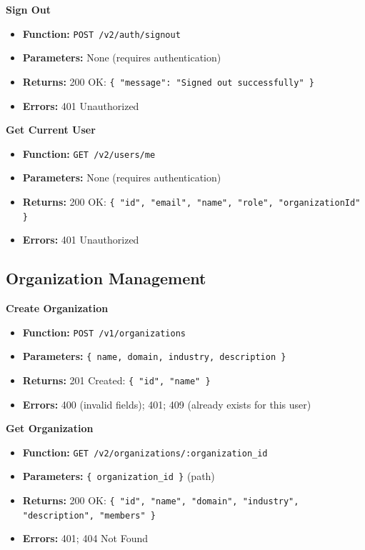 \documentclass[a4paper]{article}
\begin{document}
\textbf{Sign Out}
\begin{itemize}
  \item \textbf{Function:} \texttt{POST /v2/auth/signout}
  \item \textbf{Parameters:} None (requires authentication)
  \item \textbf{Returns:} 200 OK: \texttt{\{ "message": "Signed out successfully" \}}
  \item \textbf{Errors:} 401 Unauthorized
\end{itemize}

\textbf{Get Current User}
\begin{itemize}
  \item \textbf{Function:} \texttt{GET /v2/users/me}
  \item \textbf{Parameters:} None (requires authentication)
  \item \textbf{Returns:} 200 OK: \texttt{\{ "id", "email", "name", "role", "organizationId" \}}
  \item \textbf{Errors:} 401 Unauthorized
\end{itemize}

\subsection{Organization Management}

\textbf{Create Organization}
\begin{itemize}
  \item \textbf{Function:} \texttt{POST /v1/organizations}
  \item \textbf{Parameters:} \texttt{\{ name, domain, industry, description \}}
  \item \textbf{Returns:} 201 Created: \texttt{\{ "id", "name" \}}
  \item \textbf{Errors:} 400 (invalid fields); 401; 409 (already exists for this user)
\end{itemize}

\textbf{Get Organization}
\begin{itemize}
  \item \textbf{Function:} \texttt{GET /v2/organizations/:organization\_id}
  \item \textbf{Parameters:} \texttt{\{ organization\_id \}} (path)
  \item \textbf{Returns:} 200 OK: \texttt{\{ "id", "name", "domain", "industry", "description", "members" \}}
  \item \textbf{Errors:} 401; 404 Not Found
\end{itemize}
\end{document}
